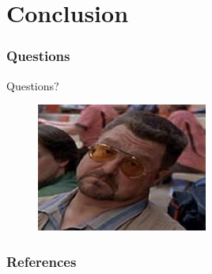 \message{ !name(presentation.tex)}\documentclass[usenames,dvipsnames]{beamer}
\begin{document}
\section{Conclusion}\label{sec:conclusion}
\begin{frame}
  \frametitle{Questions}
  \begin{center}
    \Huge{Questions?}
  \end{center}
  \begin{figure}
    \centering
    \includegraphics[width=0.5\textwidth,keepaspectratio]{figures/walter.jpg}
  \end{figure}
\end{frame}
\begin{frame}[allowframebreaks]
  \frametitle{References}
  \printbibliography{}
\end{frame}
\end{document}
